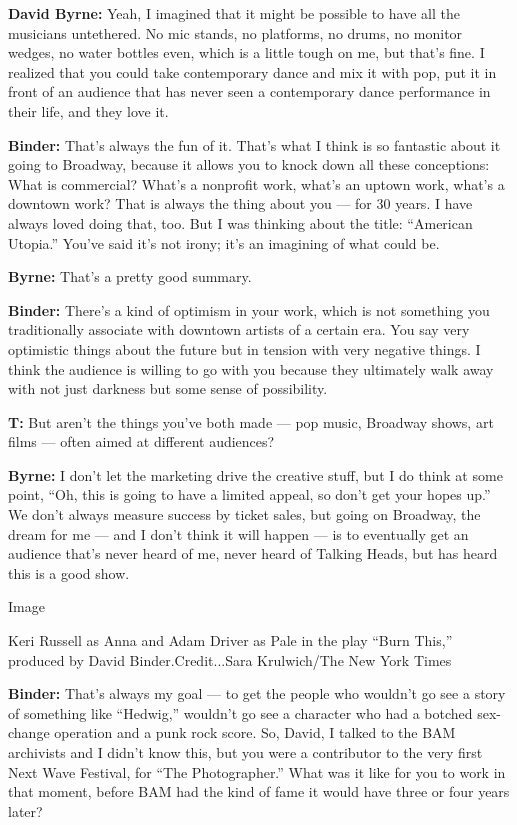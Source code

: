 \textbf{David Byrne:} Yeah, I imagined that it might be possible to have
all the musicians untethered. No mic stands, no platforms, no drums, no
monitor wedges, no water bottles even, which is a little tough on me,
but that's fine. I realized that you could take contemporary dance and
mix it with pop, put it in front of an audience that has never seen a
contemporary dance performance in their life, and they love it.

\textbf{Binder:} That's always the fun of it. That's what I think is so
fantastic about it going to Broadway, because it allows you to knock
down all these conceptions: What is commercial? What's a nonprofit work,
what's an uptown work, what's a downtown work? That is always the thing
about you --- for 30 years. I have always loved doing that, too. But I
was thinking about the title: ``American Utopia.'' You've said it's not
irony; it's an imagining of what could be.

\textbf{Byrne:} That's a pretty good summary.

\textbf{Binder:} There's a kind of optimism in your work, which is not
something you traditionally associate with downtown artists of a certain
era. You say very optimistic things about the future but in tension with
very negative things. I think the audience is willing to go with you
because they ultimately walk away with not just darkness but some sense
of possibility.

\textbf{T:} But aren't the things you've both made --- pop music,
Broadway shows, art films --- often aimed at different audiences?

\textbf{Byrne:} I don't let the marketing drive the creative stuff, but
I do think at some point, ``Oh, this is going to have a limited appeal,
so don't get your hopes up.'' We don't always measure success by ticket
sales, but going on Broadway, the dream for me --- and I don't think it
will happen --- is to eventually get an audience that's never heard of
me, never heard of Talking Heads, but has heard this is a good show.

Image

Keri Russell as Anna and Adam Driver as Pale in the play ``Burn This,''
produced by David Binder.Credit...Sara Krulwich/The New York Times

\textbf{Binder:} That's always my goal --- to get the people who
wouldn't go see a story of something like ``Hedwig,'' wouldn't go see a
character who had a botched sex-change operation and a punk rock score.
So, David, I talked to the BAM archivists and I didn't know this, but
you were a contributor to the very first Next Wave Festival, for ``The
Photographer.'' What was it like for you to work in that moment, before
BAM had the kind of fame it would have three or four years later?

